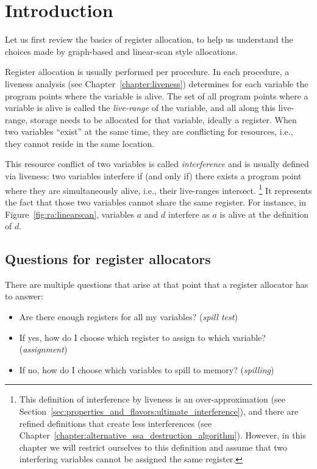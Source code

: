 {\section{Introduction}

Let us first review the basics of register allocation, to help us understand the choices made by graph-based and linear-scan style allocations.

Register allocation is usually performed per procedure. 
In each procedure, a liveness analysis (see Chapter~\ref{chapter:liveness}) determines for each variable the program points where the variable is alive. 
The set of all program points where a variable is alive is called the \emph{live-range} of the variable, and all along this live-range, storage needs to be allocated for that variable, ideally a register. When two variables ``exist'' at the same time, they are conflicting for resources, i.e., they cannot reside in the same location.

This resource conflict of two variables is called \emph{interference} and is usually defined via liveness: 
two variables interfere if (and only if) there exists a program point where they are simultaneously alive, i.e., their live-ranges intersect.%
\footnote{ This definition of interference by liveness is an over-approximation (see Section~\ref{sec:properties_and_flavors:ultimate_interference}), and there are refined definitions that create less interferences (see Chapter~\ref{chapter:alternative_ssa_destruction_algorithm}). 
  However, in this chapter we will restrict ourselves to this definition and assume that two interfering variables cannot be assigned the same register. 
}
It represents the fact that those two variables cannot share the same register.
For instance, in Figure~\ref{fig:ra:linearscan}, variables $a$ and $d$ interfere as $a$ is alive at the definition of $d$.

\subsection{Questions for register allocators}

There are multiple questions that arise at that point that a register allocator has to answer:
\begin{itemize}
  \item Are there enough registers for all my variables? (\emph{spill test})
  \item If yes, how do I choose which register to assign to which variable? (\emph{assignment})
  \item If no, how do I choose which variables to spill to memory? (\emph{spilling})
\end{itemize}

}

